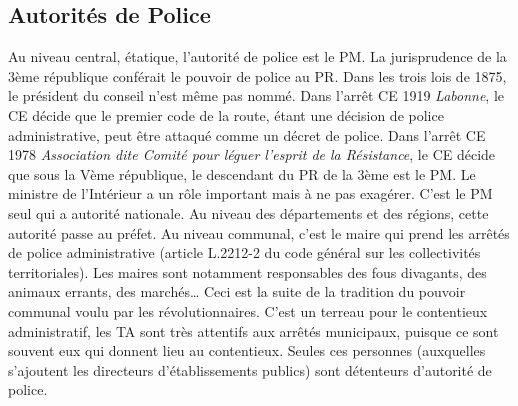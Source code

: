 \documentclass[math]{cours}
\begin{document}
\subsection{Autorités de Police}
Au niveau central, étatique, l'autorité de police est le PM.
La jurisprudence de la 3ème république conférait le pouvoir de police au PR.
Dans les trois lois de 1875, le président du conseil n'est même pas nommé.
Dans l'arrêt CE 1919 \emph{Labonne}, le CE décide que le premier code de la route, étant une décision de police administrative, peut être attaqué comme un décret de police.
Dans l'arrêt CE 1978 \emph{Association dite Comité pour léguer l'esprit de la Résistance}, le CE décide que sous la Vème république, le descendant du PR de la 3ème est le PM.
Le ministre de l'Intérieur a un rôle important mais à ne pas exagérer. C'est le PM seul qui a autorité nationale.
Au niveau des départements et des régions, cette autorité passe au préfet.
Au niveau communal, c'est le maire qui prend les arrêtés de police administrative (article L.2212-2 du code général sur les collectivités territoriales).
Les maires sont notamment responsables des fous divagants, des animaux errants, des marchés\ldots
Ceci est la suite de la tradition du pouvoir communal voulu par les révolutionnaires.
C'est un terreau pour le contentieux administratif, les TA sont très attentifs aux arrêtés municipaux, puisque ce sont souvent eux qui donnent lieu au contentieux.
Seules ces personnes (auxquelles s'ajoutent les directeurs d'établissements publics) sont détenteurs d'autorité de police.
\end{document}
